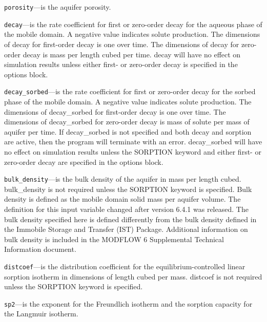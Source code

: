 \begin{description}
\item \texttt{porosity}---is the aquifer porosity.

\item \texttt{decay}---is the rate coefficient for first or zero-order decay for the aqueous phase of the mobile domain.  A negative value indicates solute production.  The dimensions of decay for first-order decay is one over time.  The dimensions of decay for zero-order decay is mass per length cubed per time.  decay will have no effect on simulation results unless either first- or zero-order decay is specified in the options block.

\item \texttt{decay\_sorbed}---is the rate coefficient for first or zero-order decay for the sorbed phase of the mobile domain.  A negative value indicates solute production.  The dimensions of decay\_sorbed for first-order decay is one over time.  The dimensions of decay\_sorbed for zero-order decay is mass of solute per mass of aquifer per time.  If decay\_sorbed is not specified and both decay and sorption are active, then the program will terminate with an error.  decay\_sorbed will have no effect on simulation results unless the SORPTION keyword and either first- or zero-order decay are specified in the options block.

\item \texttt{bulk\_density}---is the bulk density of the aquifer in mass per length cubed.  bulk\_density is not required unless the SORPTION keyword is specified.  Bulk density is defined as the mobile domain solid mass per aquifer volume.  The definition for this input variable changed after version 6.4.1 was released.  The bulk density specified here is defined differently from the bulk density defined in the Immobile Storage and Transfer (IST) Package. Additional information on bulk density is included in the MODFLOW 6 Supplemental Technical Information document.

\item \texttt{distcoef}---is the distribution coefficient for the equilibrium-controlled linear sorption isotherm in dimensions of length cubed per mass.  distcoef is not required unless the SORPTION keyword is specified.

\item \texttt{sp2}---is the exponent for the Freundlich isotherm and the sorption capacity for the Langmuir isotherm.

\end{description}

